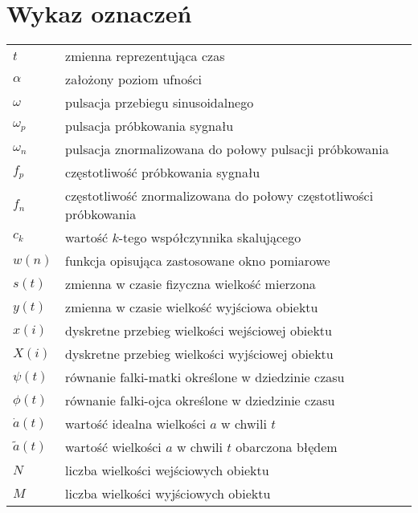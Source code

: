 \chapter*{Wykaz oznaczeń}

\begin{longtable}[l]{ l @{~~--~~} p{368pt} } 
$t$                             & zmienna reprezentująca czas \\ 
$\alpha$                        & założony poziom ufności \\
$\omega$                        & pulsacja przebiegu sinusoidalnego \\
$\omega_{p}$                    & pulsacja próbkowania sygnału \\
$\omega_{n}$                    & pulsacja znormalizowana do połowy pulsacji próbkowania \\
$f_{p}$                         & częstotliwość próbkowania sygnału \\
$f_{n}$                         & częstotliwość znormalizowana do połowy częstotliwości próbkowania \\
$c_{k}$                         & wartość $k$-tego współczynnika skalującego \\
$w(n)$                          & funkcja opisująca zastosowane okno pomiarowe \\ 
$s(t)$                          & zmienna w czasie fizyczna wielkość mierzona \\
$y(t)$                          & zmienna w czasie wielkość wyjściowa obiektu \\
$x(i)$                          & dyskretne przebieg wielkości wejściowej obiektu \\
$X(i)$                          & dyskretne przebieg wielkości wyjściowej obiektu \\
$\psi(t)$                       & równanie falki-matki określone w dziedzinie czasu \\
$\phi(t)$                       & równanie falki-ojca określone w dziedzinie czasu \\
$\dot{a}(t)$                    & wartość idealna wielkości $a$ w chwili $t$ \\
$\tilde{a}(t)$                  & wartość wielkości $a$ w chwili $t$ obarczona błędem \\
$N$                             & liczba wielkości wejściowych obiektu \\
$M$                             & liczba wielkości wyjściowych obiektu \\

\end{longtable}
